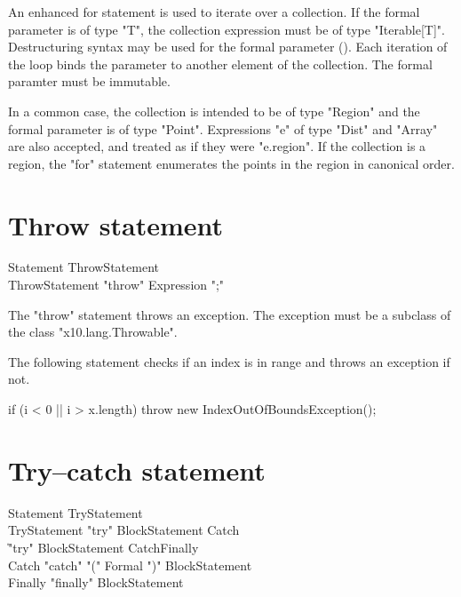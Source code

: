\label{ForAllLoop}


An enhanced for statement is used to iterate over a collection.
If the formal parameter is of type \xcd"T",
the collection expression must be of type \xcd"Iterable[T]".
Destructuring
syntax may
be used for the formal parameter ().
Each iteration of the loop
binds the parameter to another element of the collection.
The formal paramter must be immutable. 

In a common case, 
the collection is intended to be of type
\xcd"Region" and the formal parameter is of type \xcd"Point".
Expressions \xcd"e" of type \xcd"Dist" and
\xcd"Array" are also accepted, and treated as if they were
\xcd"e.region".
If the collection is a region, the \xcd"for" statement
enumerates the points in the region in canonical order.



\section{Throw statement}

\begin{grammar}
Statement \: ThrowStatement \\
ThrowStatement \: \xcd"throw" Expression \xcd";"
\end{grammar}

The \xcd"throw" statement throws an exception.  The exception
must be a subclass of the class \xcd"x10.lang.Throwable". 

\begin{example}
The following statement checks if an index is in range and
throws an exception if not.
\begin{xten}
if (i < 0 || i > x.length)
    throw new IndexOutOfBoundsException();
\end{xten}
\end{example}

\section{Try--catch statement}

\begin{grammar}
Statement \: TryStatement \\
TryStatement \: \xcd"try" BlockStatement Catch\plus  \\
             \| \xcd"try" BlockStatement Catch\star Finally \\
Catch \: \xcd"catch" \xcd"(" Formal \xcd")" BlockStatement \\
Finally \: \xcd"finally" BlockStatement \\
\end{grammar}

